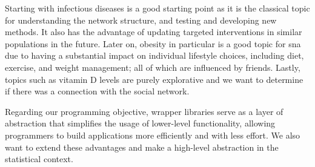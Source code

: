 
Starting with infectious diseases is a good starting point as it is the classical topic for understanding the network structure, and testing and developing new methods. It also has the advantage of updating targeted interventions in similar populations in the future. Later on, obesity in particular is a good topic for \gls{sna} due to having a substantial impact on individual lifestyle choices, including diet, exercise, and weight management; all of which are influenced by friends. Lastly, topics such as vitamin D levels are purely explorative and we want to determine if there was a connection with the social network.

Regarding our programming objective, wrapper libraries serve as a layer of abstraction that simplifies the usage of lower-level functionality, allowing programmers to build applications more efficiently and with less effort. We also want to extend these advantages and make a high-level abstraction in the statistical context.















\vspace{0.90\baselineskip}

